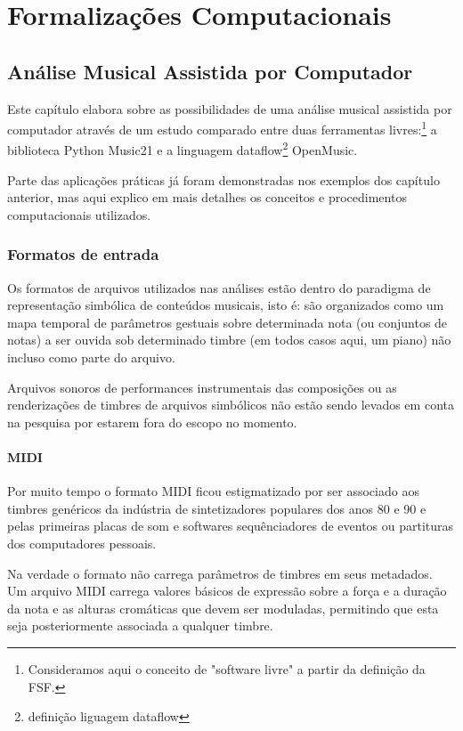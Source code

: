 \documentclass[
	12pt,				%
	openright,			%
	twoside,			%
	a4paper,			%
	english,			%
	french,				%
	spanish,			%
	brazil				%
	]{abntex2}
\begin{document}
\part{Formalizações Computacionais}


\chapter{Análise Musical Assistida por Computador}
\label{analise_computacional}

Este capítulo elabora sobre as possibilidades de uma análise musical assistida por computador através de um estudo comparado entre duas ferramentas livres:\footnote{Consideramos aqui o conceito de "software livre" a partir da definição da FSF.} a biblioteca Python Music21 e a linguagem dataflow\footnote{definição liguagem dataflow} OpenMusic.

Parte das aplicações práticas já foram demonstradas nos exemplos dos capítulo anterior, mas aqui explico em mais detalhes os conceitos e procedimentos computacionais utilizados.


\section{Formatos de entrada}


Os formatos de arquivos utilizados nas análises estão dentro do paradigma de representação simbólica de conteúdos musicais, isto é: são organizados como um mapa temporal de parâmetros gestuais sobre determinada nota (ou conjuntos de notas) a ser ouvida sob determinado timbre (em todos casos aqui, um piano) não incluso como parte do arquivo. 

Arquivos sonoros de performances instrumentais das composições ou as renderizações de timbres de arquivos simbólicos não estão sendo levados em conta na pesquisa por estarem fora do escopo no momento.



\subsection{MIDI}

Por muito tempo o formato MIDI ficou estigmatizado por ser associado aos timbres genéricos da indústria de sintetizadores populares dos anos 80 e 90 e pelas primeiras placas de som e softwares sequênciadores de eventos ou partituras dos computadores pessoais. 

Na verdade o formato não carrega parâmetros de timbres em seus metadados. Um arquivo MIDI carrega valores básicos de expressão sobre a força e a duração da nota e as alturas cromáticas que devem ser moduladas, permitindo que esta seja posteriormente associada a qualquer timbre.
\end{document}
